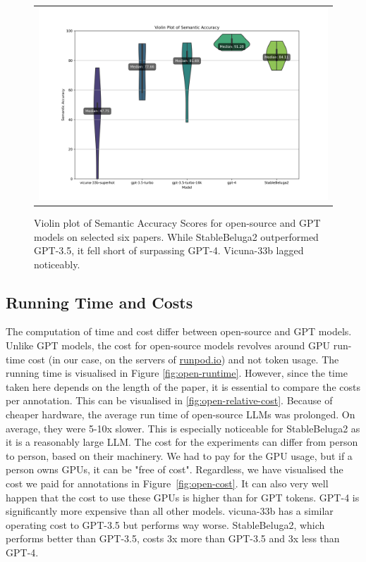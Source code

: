 \begin{figure}[htpb]
  \centering
  \begin{tabular}{c}
  \includegraphics[width=14cm]{images/open-semantic.png}
  \end{tabular}
  \caption[Semantic Accuracy]{Violin plot of Semantic Accuracy Scores for open-source and GPT models on selected six papers. While StableBeluga2 outperformed GPT-3.5, it fell short of surpassing GPT-4. Vicuna-33b lagged noticeably.}\label{fig:open-semantic}
\end{figure}

\subsection{Running Time and Costs}

The computation of time and cost differ between open-source and GPT models. Unlike GPT models, the cost for open-source models revolves around GPU run-time cost (in our case, on the servers of \href{https://runpod.io}{runpod.io}) and not token usage. The running time is visualised in Figure \ref{fig:open-runtime}. However, since the time taken here depends on the length of the paper, it is essential to compare the costs per annotation. This can be visualised in \ref{fig:open-relative-cost}. Because of cheaper hardware, the average run time of open-source LLMs was prolonged. On average, they were 5-10x slower. This is especially noticeable for StableBeluga2 as it is a reasonably large LLM. The cost for the experiments can differ from person to person, based on their machinery. We had to pay for the GPU usage, but if a person owns GPUs, it can be "free of cost". Regardless, we have visualised the cost we paid for annotations in Figure~\ref{fig:open-cost}. It can also very well happen that the cost to use these GPUs is higher than for GPT tokens. GPT-4 is significantly more expensive than all other models. vicuna-33b has a similar operating cost to GPT-3.5 but performs way worse. StableBeluga2, which performs better than GPT-3.5, costs 3x more than GPT-3.5 and 3x less than GPT-4.

